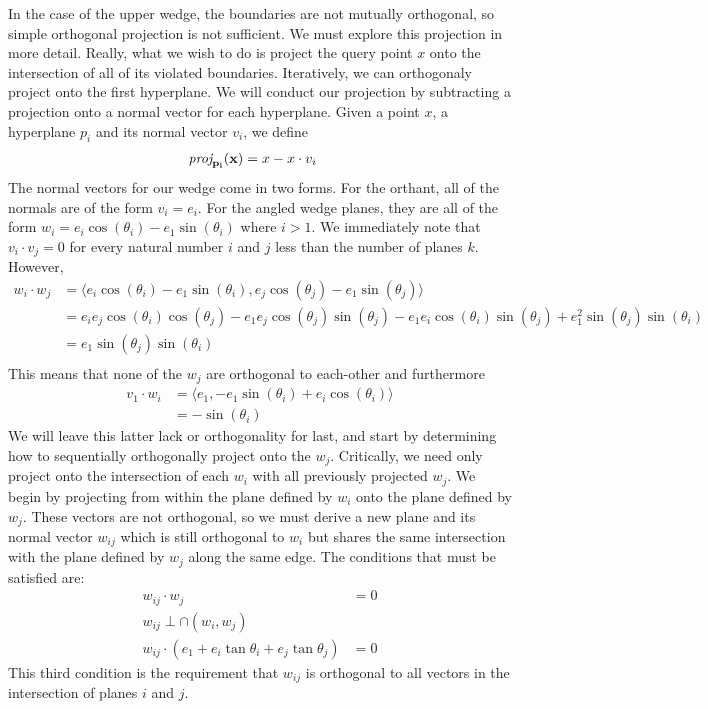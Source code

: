 In the case of the upper wedge, the boundaries are not mutually orthogonal, so
simple orthogonal projection is not sufficient. We must explore this
projection in more detail. Really, what we wish to do is project the
query point $x$ onto the intersection of all of its violated
boundaries. Iteratively, we can orthogonaly project onto the first
hyperplane. We will conduct our projection by subtracting a projection
onto a normal vector for each hyperplane. Given a point $x$, a
hyperplane $p_i$ and its normal vector $v_i$, we define 
\begin{align}
\vectorproj[p_i]{(x)} &= x - x \cdot v_i
\end{align}
The normal vectors for our wedge come in two forms. For the orthant,
all of the normals are of the form $v_i = e_i$. For the angled wedge planes,
they are all of the form $w_i = e_i \cos(\theta_i) - e_1
\sin(\theta_i)$ where $i > 1$. We immediately note that $v_i \cdot v_j
= 0$ for every natural number $i$ and $j$ less than the number of
planes $k$. However,
\begin{align}
  w_i \cdot w_j &= \langle e_i \cos(\theta_i) - e_1 \sin(\theta_i), e_j
                  \cos(\theta_j) - e_1 \sin(\theta_j)\rangle\\
                &= e_ie_j\cos(\theta_i)\cos(\theta_j) -
                  e_1e_j\cos(\theta_j)\sin(\theta_j) - e_1e_i
                  \cos(\theta_i)\sin(\theta_j) +
                  e_1^2\sin(\theta_j)\sin(\theta_i)\\
                &= e_1 \sin(\theta_j)\sin(\theta_i)\\
\end{align}
This means that none of the $w_j$ are orthogonal to each-other and
furthermore 
\begin{align}
  v_1 \cdot w_i &= \langle e_1, -e_1 \sin(\theta_i) + e_i
                  \cos(\theta_i) \rangle \\
                  &= -\sin(\theta_i)
\end{align}
We will leave this latter lack or orthogonality for last, and start by
determining how to sequentially orthogonally project onto the
$w_j$. Critically, we need only project onto the intersection of each
$w_i$ with all previously projected $w_j$. We begin by projecting
from within the plane defined by $w_i$ onto the plane defined by
$w_j$. These vectors are not orthogonal, so we must derive a new
plane and its normal vector $w_{ij}$ which is still orthogonal to $w_i$ but
shares the same intersection with the plane defined by $w_j$ along the
same edge. The conditions that must be satisfied are: 
\begin{align}
  w_{ij} \cdot w_j &= 0 \\
  w_{ij} \perp \cap(w_i, w_j)\\
  w_{ij} \cdot (e_1 + e_i \tan \theta_i + e_j \tan \theta_j) &= 0
\end{align}
This third condition is the requirement that $w_{ij}$ is orthogonal to all
vectors in the intersection of planes $i$ and $j$.

